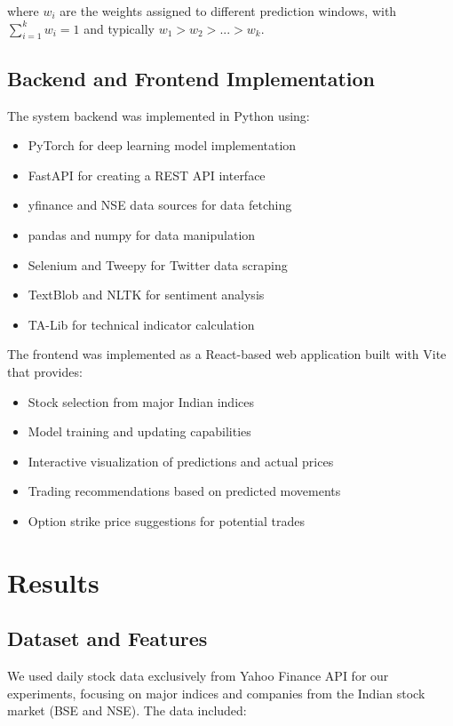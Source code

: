 \documentclass[conference]{IEEEtran}
\begin{document}
where $w_i$ are the weights assigned to different prediction windows, with $\sum_{i=1}^{k} w_i = 1$ and typically $w_1 > w_2 > ... > w_k$.

\subsection{Backend and Frontend Implementation}
The system backend was implemented in Python using:

\begin{itemize}
\item PyTorch for deep learning model implementation
\item FastAPI for creating a REST API interface
\item yfinance and NSE data sources for data fetching
\item pandas and numpy for data manipulation
\item Selenium and Tweepy for Twitter data scraping
\item TextBlob and NLTK for sentiment analysis
\item TA-Lib for technical indicator calculation
\end{itemize}

The frontend was implemented as a React-based web application built with Vite that provides:

\begin{itemize}
\item Stock selection from major Indian indices
\item Model training and updating capabilities
\item Interactive visualization of predictions and actual prices
\item Trading recommendations based on predicted movements
\item Option strike price suggestions for potential trades
\end{itemize}

\section{Results}
\subsection{Dataset and Features}
We used daily stock data exclusively from Yahoo Finance API for our experiments, focusing on major indices and companies from the Indian stock market (BSE and NSE). The data included:
\end{document}
